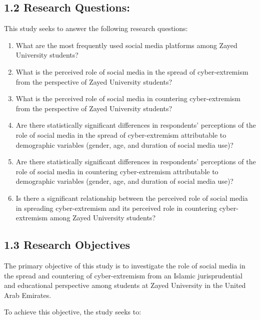 \documentclass[10pt]{NSP1}
\begin{document}
	\subsection*{1.2 Research Questions:}
	
	This study seeks to answer the following research questions:
	
	\begin{enumerate}
		\item What are the most frequently used social media platforms among Zayed University students?
		\item What is the perceived role of social media in the spread of cyber-extremism from the perspective of Zayed University students?
		\item What is the perceived role of social media in countering cyber-extremism from the perspective of Zayed University students?
		\item Are there statistically significant differences in respondents' perceptions of the role of social media in the spread of cyber-extremism attributable to demographic variables (gender, age, and duration of social media use)?
		\item Are there statistically significant differences in respondents' perceptions of the role of social media in countering cyber-extremism attributable to demographic variables (gender, age, and duration of social media use)?
		\item Is there a significant relationship between the perceived role of social media in spreading cyber-extremism and its perceived role in countering cyber-extremism among Zayed University students?
	\end{enumerate}
	
	\subsection*{1.3 Research Objectives}
	
	The primary objective of this study is to investigate the role of social media in the spread and countering of cyber-extremism from an Islamic jurisprudential and educational perspective among students at Zayed University in the United Arab Emirates.
	
	To achieve this objective, the study seeks to:
	
\end{document}
